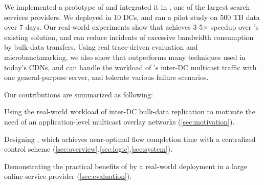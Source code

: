 We implemented a prototype of \name and integrated it in
\company, one of the largest search services providers.
We deployed \name in 10 DCs, and ran a pilot study on 500 TB
data over 7 days.
Our real-world experiments show that \name achieves 3-5$\times$
speedup over \company's existing solution, and can reduce
incidents of excessive bandwidth consumption by bulk-data
transfers.
Using real trace-driven evaluation and microbanchmarking,
we also show that \name outperforms many techniques used in
today's CDNs, and \name can handle the workload of \company's
inter-DC multicast traffic with one general-purpose server,
and tolerate various failure scenarios.


Our contributions are summarized as following:
\begin{packeditemize}
\item Using the real-world workload of inter-DC bulk-data
replication to motivate the need of an application-level
multicast overlay networks (\Section\ref{sec:motivation}).
\item Designing \name, which achieves near-optimal flow completion
time with a centralized control scheme (\Section\ref{sec:overview},\ref{sec:logic},\ref{sec:system}).
\item Demonstrating the practical benefits of \name by a real-world
 deployment in a large online service provider (\Section\ref{sec:evaluation}).
\end{packeditemize}
